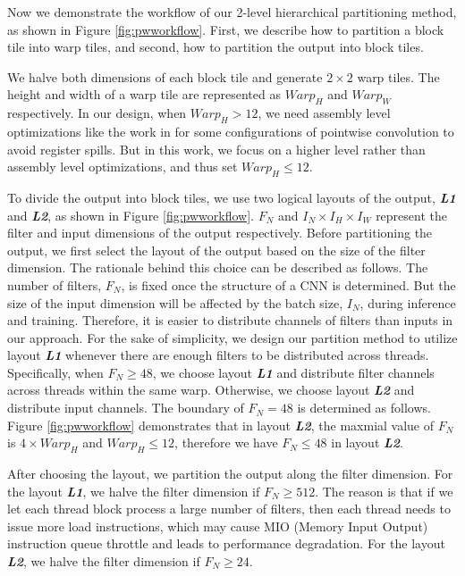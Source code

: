 Now we demonstrate the workflow of our 2-level hierarchical partitioning method, as shown in Figure \ref{fig:pwworkflow}.
First, we describe how to partition a block tile into warp tiles, and second, how to partition the output into block tiles.

We halve both dimensions of each block tile and generate $2 \times 2$ warp tiles. 
The height and width of a warp tile are represented as $Warp_H$ and $Warp_W$ respectively.
In our design, when $Warp_H > 12$, we need assembly level optimizations like the work in \cite{yan2020optimizing,yan2020demystifying} for some configurations of pointwise convolution to avoid register spills.
But in this work, we focus on a higher level rather than assembly level optimizations, and thus set $Warp_H \leq 12$.

To divide the output into block tiles, we use two logical layouts of the output, \textbf{\emph{L1}} and \textbf{\emph{L2}}, as shown in Figure \ref{fig:pwworkflow}. 
$F_N$ and $I_N \times I_H \times I_W$ represent the filter and input dimensions of the output respectively.
Before partitioning the output, we first select the layout of the output based on the size of the filter dimension.
The rationale behind this choice can be described as follows. 
The number of filters, $F_N$, is fixed once the structure of a CNN is determined. 
But the size of the input dimension will be affected by the batch size, $I_N$, during inference and training.
Therefore, it is easier to distribute channels of filters than inputs in our approach.
For the sake of simplicity, we design our partition method to utilize layout \textbf{\emph{L1}} whenever there are enough filters to be distributed across threads.
Specifically, when $F_N \ge 48$, we choose layout \textbf{\emph{L1}} and distribute filter channels across threads within the same warp. 
Otherwise, we choose layout \textbf{\emph{L2}} and distribute input channels.
The boundary of $F_N = 48$ is determined as follows.
Figure \ref{fig:pwworkflow} demonstrates that in layout \textbf{\emph{L2}}, the maxmial value of $F_N$ is $4 \times Warp_H$ and $Warp_H \leq 12$, therefore we have $F_N \leq 48$ in layout \textbf{\emph{L2}}.

After choosing the layout, we partition the output along the filter dimension.
For the layout \textbf{\emph{L1}}, we halve the filter dimension if $F_N \geq 512$. 
The reason is that if we let each thread block process a large number of filters, then each thread needs to issue more load instructions, which may cause MIO (Memory Input Output) instruction queue throttle and leads to performance degradation.  
For the layout \textbf{\emph{L2}}, we halve the filter dimension if $F_N \geq 24$.

